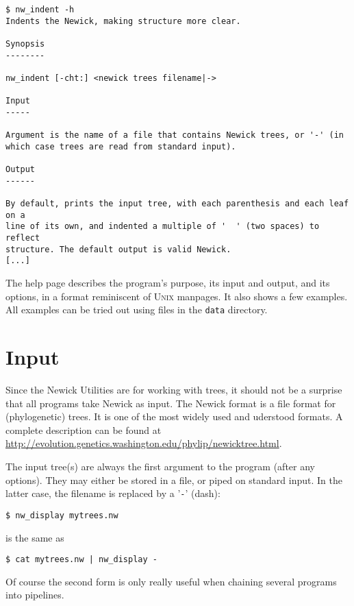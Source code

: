 \documentclass[a4paper,10pt]{report}
\newcommand{\nutils}{Newick Utilities}
\newcommand{\unix}{\textsc{Unix}}
\newcommand{\stdin}{standard input}
\begin{document}
\begin{samepage}
\begin{verbatim}
$ nw_indent -h
Indents the Newick, making structure more clear.

Synopsis
--------

nw_indent [-cht:] <newick trees filename|->

Input
-----

Argument is the name of a file that contains Newick trees, or '-' (in
which case trees are read from standard input).

Output
------

By default, prints the input tree, with each parenthesis and each leaf on a
line of its own, and indented a multiple of '  ' (two spaces) to reflect
structure. The default output is valid Newick.
[...]
\end{verbatim}
\end{samepage}
The help page describes the program's purpose, its input and output, and its options, in a format reminiscent of \unix{} manpages. It also shows a few examples. All examples can be tried out using files in the \texttt{data} directory.

\section{Input}
\label{sect_input}

Since the \nutils{} are for working with trees, it should not be a surprise that all programs take Newick as input. The Newick format is a file format for (phylogenetic) trees. It is one of the most widely used and uderstood formats.
A complete description can be found at \url{http://evolution.genetics.washington.edu/phylip/newicktree.html}.

The input tree(s) are always the first argument to the program (after any options). They may either be stored in a file, or piped on \stdin{}. In the latter case, the filename is replaced by a '\texttt{-}' (dash):

\begin{samepage}
\begin{verbatim}
$ nw_display mytrees.nw
\end{verbatim}
is the same as
\begin{verbatim}
$ cat mytrees.nw | nw_display -
\end{verbatim}
\end{samepage}
Of course the second form is only really useful when chaining several programs into pipelines.
\end{document}
